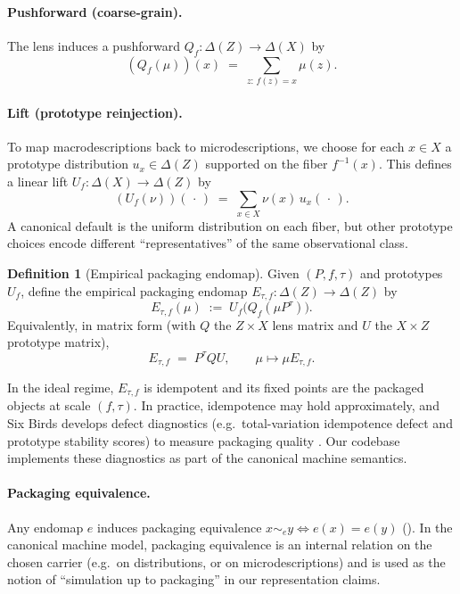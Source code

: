 \documentclass[11pt]{article}
\theoremstyle{definition}
\newtheorem{definition}[theorem]{Definition}
\theoremstyle{remark}
\begin{document}
\paragraph{Pushforward (coarse-grain).}
The lens induces a pushforward $Q_f:\Delta(Z)\to \Delta(X)$ by
\[
(Q_f(\mu))(x) \;=\; \sum_{z:\, f(z)=x} \mu(z).
\]

\paragraph{Lift (prototype reinjection).}
To map macrodescriptions back to microdescriptions, we choose for each $x\in X$ a prototype distribution $u_x\in\Delta(Z)$ supported on the fiber $f^{-1}(x)$.
This defines a linear lift $U_f:\Delta(X)\to \Delta(Z)$ by
\[
(U_f(\nu))(\,\cdot\,) \;=\; \sum_{x\in X} \nu(x)\,u_x(\,\cdot\,).
\]
A canonical default is the uniform distribution on each fiber, but other prototype choices encode different ``representatives'' of the same observational class.

\begin{definition}[Empirical packaging endomap]
\label{def:empirical-packaging}
Given $(P,f,\tau)$ and prototypes $U_f$, define the empirical packaging endomap $E_{\tau,f}:\Delta(Z)\to\Delta(Z)$ by
\begin{equation}
\label{eq:E-tau-f}
E_{\tau,f}(\mu)
\;:=\;
U_f\!\big(Q_f(\mu P^\tau)\big).
\end{equation}
Equivalently, in matrix form (with $Q$ the $Z\!\times\! X$ lens matrix and $U$ the $X\!\times\! Z$ prototype matrix),
\[
E_{\tau,f} \;=\; P^\tau Q U,
\qquad
\mu \mapsto \mu E_{\tau,f}.
\]
\end{definition}

In the ideal regime, $E_{\tau,f}$ is idempotent and its fixed points are the packaged objects at scale $(f,\tau)$.
In practice, idempotence may hold approximately, and Six Birds develops defect diagnostics (e.g.\ total-variation idempotence defect and prototype stability scores) to measure packaging quality \citep{sixbirds2026}.
Our codebase implements these diagnostics as part of the canonical machine semantics.

\paragraph{Packaging equivalence.}
Any endomap $e$ induces packaging equivalence $x\sim_e y \iff e(x)=e(y)$ ().
In the canonical machine model, packaging equivalence is an internal relation on the chosen carrier (e.g.\ on distributions, or on microdescriptions) and is used as the notion of ``simulation up to packaging'' in our representation claims.
\end{document}
